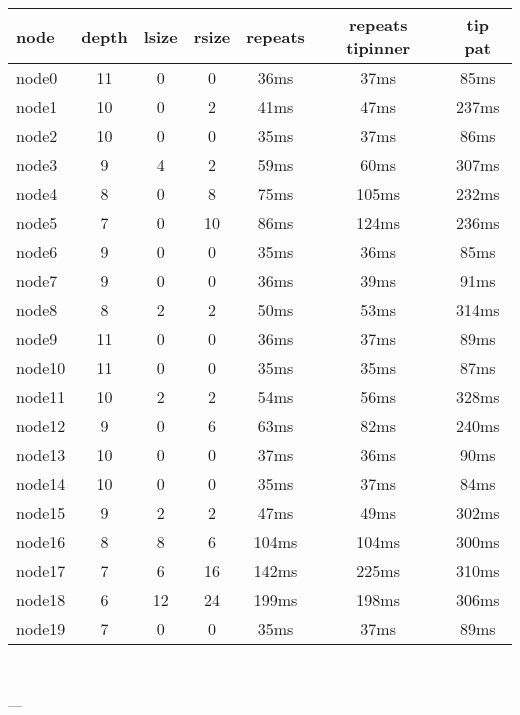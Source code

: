 \begin{tabular}{|l|c|c|c|c|c|c|}
\hline node & depth & lsize & rsize  & repeats & repeats tipinner & tip pat\\
    \hline node0 & 11 & 0 & 0 & 36ms & 37ms & 85ms\\
    \hline node1 & 10 & 0 & 2 & 41ms & 47ms & 237ms\\
    \hline node2 & 10 & 0 & 0 & 35ms & 37ms & 86ms\\
    \hline node3 & 9 & 4 & 2 & 59ms & 60ms & 307ms\\
    \hline node4 & 8 & 0 & 8 & 75ms & 105ms & 232ms\\
    \hline node5 & 7 & 0 & 10 & 86ms & 124ms & 236ms\\
    \hline node6 & 9 & 0 & 0 & 35ms & 36ms & 85ms\\
    \hline node7 & 9 & 0 & 0 & 36ms & 39ms & 91ms\\
    \hline node8 & 8 & 2 & 2 & 50ms & 53ms & 314ms\\
    \hline node9 & 11 & 0 & 0 & 36ms & 37ms & 89ms\\
    \hline node10 & 11 & 0 & 0 & 35ms & 35ms & 87ms\\
    \hline node11 & 10 & 2 & 2 & 54ms & 56ms & 328ms\\
    \hline node12 & 9 & 0 & 6 & 63ms & 82ms & 240ms\\
    \hline node13 & 10 & 0 & 0 & 37ms & 36ms & 90ms\\
    \hline node14 & 10 & 0 & 0 & 35ms & 37ms & 84ms\\
    \hline node15 & 9 & 2 & 2 & 47ms & 49ms & 302ms\\
    \hline node16 & 8 & 8 & 6 & 104ms & 104ms & 300ms\\
    \hline node17 & 7 & 6 & 16 & 142ms & 225ms & 310ms\\
    \hline node18 & 6 & 12 & 24 & 199ms & 198ms & 306ms\\
    \hline node19 & 7 & 0 & 0 & 35ms & 37ms & 89ms\\

\hline
\end{tabular} \

---


